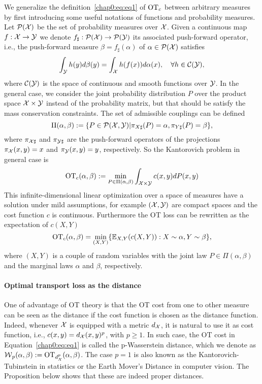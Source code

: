 We generalize the definition~\eqref{chap0:eq:eq1} of $\mathrm{OT}_{c}$ between arbitrary measures by first introducing some useful notations of functions and probability measures.  Let $\mathcal{P}(\mathcal{X})$ be the set of probability measures over $\mathcal{X}$. Given a continuous map $f: \mathcal{X} \rightarrow \mathcal{Y}$ we denote  $f_{\sharp}: \mathcal{P}(\mathcal{X}) \rightarrow \mathcal{P}(\mathcal{Y})$ its associated push-forward operator, i.e.,   the push-forward measure $\beta = f_{\sharp}(\alpha)$  of $\alpha \in \mathcal{P}(\mathcal{X})$ satisfies
\begin{equation*}
\int_{\mathcal{Y}} h(y)d\beta(y) = \int_{\mathcal{X}} h(f(x)) d\alpha(x), \quad \forall h \in  \mathcal{C}(\mathcal{Y}),
\end{equation*}
where $\mathcal{C}(\mathcal{Y})$ is the space of continuous and smooth functions over $\mathcal{Y}$. In the general case, we consider the joint probability distribution $P$  over the product space $\mathcal{X} \times \mathcal{Y}$ instead of the probability matrix, but that should be satisfy the mass conservation constraints.
The set of admissible couplings can be defined
\begin{equation*}
\Pi(\alpha, \beta) :=\{ P \in \mathcal{P}(\mathcal{X}, \mathcal{Y})| \pi_{X \sharp} (P) = \alpha, \pi_{Y\sharp}(P) = \beta \},
\end{equation*}
where $\pi_{\mathcal{X} \sharp}$ and $\pi_{\mathcal{Y} \sharp}$ are the push-forward operators of the projections $\pi_{\mathcal{X}}(x,y) = x$ and $\pi_{\mathcal{Y}}(x,y) = y$, respectively. So the Kantorovich problem in general case is 
\begin{equation}
\mathrm{OT}_{c}(\alpha, \beta) := \min_{P \in \Pi(\alpha, \beta)} \int_{\mathcal{X} \times \mathcal{Y}} c(x,y) dP(x,y)
\end{equation}
This infinite-dimensional linear optimization over a space of measures have a solution under mild assumptions, for example $(\mathcal{X}, \mathcal{Y})$ are compact spaces and the cost function $c$ is continuous.  Furthermore the OT loss can be rewritten as the expectation of  $c(X,Y)$  
\begin{equation}
\mathrm{OT}_{c}(\alpha, \beta) = \min_{(X,Y)} \{ \mathbb{E}_{X, Y} (c(X,Y)): X \sim \alpha, Y \sim \beta \},
\end{equation}
where $(X, Y)$ is a couple of random variables with the joint law $P \in \Pi(\alpha, \beta)$ and the marginal laws  $\alpha$ and $\beta$, respectively.
\paragraph{Optimal transport loss as the distance} 
One of advantage of OT theory is that the OT cost from one to other measure can be seen as the distance if the cost function is chosen as the distance function. Indeed, whenever $\mathcal{X}$ is equipped with a metric $d_{\mathcal{X}}$, it is natural to use it as cost function, i.e., $c(x,y) = d_{\mathcal{X}}(x,y)^p$, with $p\geq 1$. In such case, the OT cost in Equation~\eqref{chap0:eq:eq1} is called the p-Wasserstein distance, which we denote as $\operatorname{\mathcal{W}}_p(\alpha, \beta) :=  \mathrm{OT}_{d_{\mathcal{X}}^p}(\alpha, \beta)$. The case $p=1$ is also known as the Kantorovich-Tubinstein in statistics or the Earth Mover's Distance in computer vision. The Proposition below shows that these are indeed proper distances. 

